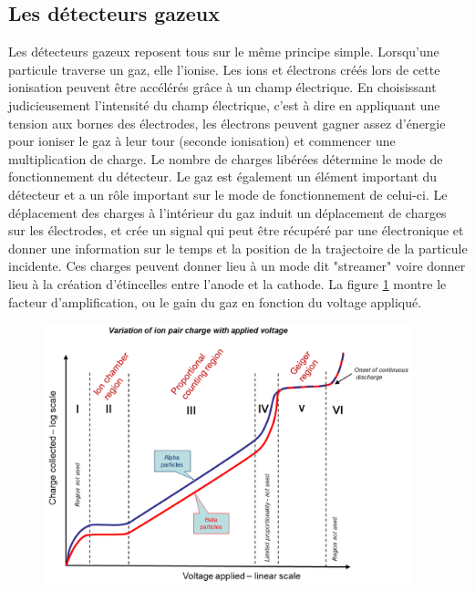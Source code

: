 \subsection{Les détecteurs gazeux}
Les détecteurs gazeux reposent tous sur le même principe simple. Lorsqu'une particule traverse un gaz, elle l'ionise. Les ions et électrons créés lors de cette ionisation peuvent être accélérés grâce à un champ électrique. En choisissant judicieusement l'intensité du champ électrique, c'est à dire en appliquant une tension aux bornes des électrodes, les électrons peuvent gagner assez d'énergie pour ioniser le gaz à leur tour (seconde ionisation) et commencer une multiplication de charge. Le nombre de charges libérées détermine le mode de fonctionnement du détecteur. Le gaz est également un élément important du détecteur et a un rôle important sur le mode de fonctionnement de celui-ci. Le déplacement des charges à l'intérieur du gaz induit un déplacement de charges sur les électrodes, et crée un signal qui peut être récupéré par une électronique et donner une information sur le temps et la position de la trajectoire de la particule incidente. Ces charges peuvent donner lieu à un mode dit "streamer" voire donner lieu à la création d'étincelles entre l'anode et la cathode. La figure \ref{mult} montre le facteur d'amplification, ou le gain du gaz en fonction du voltage appliqué. 

\begin{figure}[ht!]
	\centering
	\includegraphics[width=0.95\textwidth]{RPC/gasgain.png}
	\label{mult}
\end{figure}

